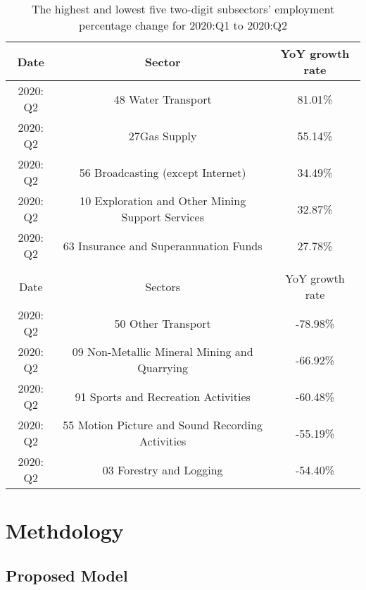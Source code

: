 \documentclass{monashthesis}
\begin{document}
\begin{table}[ht]
\begin{center}
\begin{tabular}{ccc}
\hline
Date     & Sector                                        & YoY growth rate \\
\hline
2020: Q2  & 48 Water Transport                            & 81.01\%                                \\
2020: Q2 & 27Gas Supply      & 55.14\%                                \\

2020: Q2 & 56 Broadcasting (except Internet)                            & 34.49\%                                \\
2020: Q2 & 10 Exploration and Other Mining Support Services                     & 32.87\%                                \\
2020: Q2 & 63 Insurance and Superannuation Funds & 27.78\% 
                 \\
                 \\
                 \hline
Date     &  Sectors                                      &YoY growth rate \\
                 \hline
2020: Q2 & 50 Other Transport                 &-78.98\%  
                 \\
2020: Q2 & 09 Non-Metallic Mineral Mining and Quarrying    & -66.92\% 
                 \\
2020: Q2 & 91 Sports and Recreation Activities & -60.48\% 
                 \\
2020: Q2 & 55 Motion Picture and Sound Recording Activities                           & -55.19\%  
                 \\
2020: Q2 & 03 Forestry and Logging         & -54.40\%
\end{tabular}
\end{center}
\caption{The highest and lowest five two-digit subsectors' employment percentage change for 2020:Q1 to 2020:Q2 }
\label{tab:comp}
\end{table}

\clearpage

\hypertarget{methdology}{%
\chapter{Methdology}\label{methdology}}

\hypertarget{proposed-model}{%
\section{Proposed Model}\label{proposed-model}}
\end{document}
